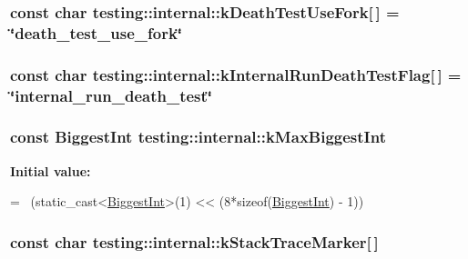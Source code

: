 \hypertarget{namespacetesting_1_1internal_a32051e2574562b548be3e26a52eaa553}{
\subsubsection[{k\-Death\-Test\-Use\-Fork}]{\setlength{\rightskip}{0pt plus 5cm}const char testing\-::internal\-::k\-Death\-Test\-Use\-Fork\mbox{[}$\,$\mbox{]} = \char`\"{}death\-\_\-test\-\_\-use\-\_\-fork\char`\"{}}}\label{namespacetesting_1_1internal_a32051e2574562b548be3e26a52eaa553}
\hypertarget{namespacetesting_1_1internal_a8572303d929880adf30db00952e1c45d}{
\subsubsection[{k\-Internal\-Run\-Death\-Test\-Flag}]{\setlength{\rightskip}{0pt plus 5cm}const char testing\-::internal\-::k\-Internal\-Run\-Death\-Test\-Flag\mbox{[}$\,$\mbox{]} = \char`\"{}internal\-\_\-run\-\_\-death\-\_\-test\char`\"{}}}\label{namespacetesting_1_1internal_a8572303d929880adf30db00952e1c45d}
\hypertarget{namespacetesting_1_1internal_ad901880198832bc166d2493096b451f7}{
\subsubsection[{k\-Max\-Biggest\-Int}]{\setlength{\rightskip}{0pt plus 5cm}const {\bf Biggest\-Int} testing\-::internal\-::k\-Max\-Biggest\-Int}}\label{namespacetesting_1_1internal_ad901880198832bc166d2493096b451f7}
{\bfseries Initial value\-:}
\begin{DoxyCode}
=
    ~(\textcolor{keyword}{static\_cast<}\hyperlink{namespacetesting_1_1internal_a05c6bd9ede5ccdf25191a590d610dcc6}{BiggestInt}\textcolor{keyword}{>}(1) << (8*\textcolor{keyword}{sizeof}(\hyperlink{namespacetesting_1_1internal_a05c6bd9ede5ccdf25191a590d610dcc6}{BiggestInt}) - 1))
\end{DoxyCode}
\hypertarget{namespacetesting_1_1internal_a999c7ef9ff01b6d2d76669372c444aa3}{
\subsubsection[{k\-Stack\-Trace\-Marker}]{ const char testing\-::internal\-::k\-Stack\-Trace\-Marker\mbox{[}$\,$\mbox{]}}}\label{namespacetesting_1_1internal_a999c7ef9ff01b6d2d76669372c444aa3}
